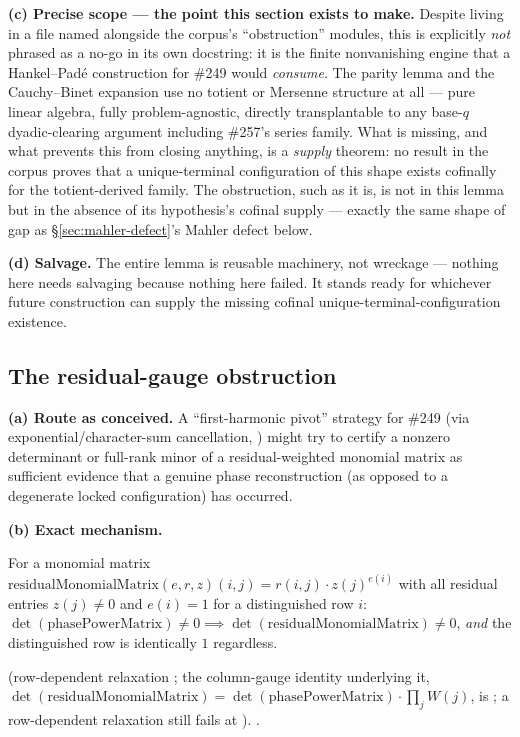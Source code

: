 \textbf{(c) Precise scope — the point this section exists to make.} Despite
living in a file named alongside the corpus's ``obstruction'' modules, this
is explicitly \emph{not} phrased as a no-go in its own docstring: it is the
finite nonvanishing engine that a Hankel--Padé construction for \#249 would
\emph{consume}. The parity lemma and the Cauchy--Binet expansion use no
totient or Mersenne structure at all — pure linear algebra, fully
problem-agnostic, directly transplantable to any base-\(q\) dyadic-clearing
argument including \#257's series family. What is missing, and what
prevents this from closing anything, is a \emph{supply} theorem: no result
in the corpus proves that a unique-terminal configuration of this shape
exists cofinally for the totient-derived family. The obstruction, such as it
is, is not in this lemma but in the absence of its hypothesis's cofinal
supply — exactly the same shape of gap as \S\ref{sec:mahler-defect}'s Mahler
defect below.

\textbf{(d) Salvage.} The entire lemma is reusable machinery, not wreckage —
nothing here needs salvaging because nothing here failed. It stands ready
for whichever future construction can supply the missing cofinal
unique-terminal-configuration existence.

\subsection{The residual-gauge obstruction}

\textbf{(a) Route as conceived.} A ``first-harmonic pivot'' strategy for
\#249 (via exponential/character-sum cancellation,
) might try to certify a nonzero determinant or
full-rank minor of a residual-weighted monomial matrix as sufficient
evidence that a genuine phase reconstruction (as opposed to a degenerate
locked configuration) has occurred.

\textbf{(b) Exact mechanism.}
\begin{prop}
For a monomial matrix \(\mathrm{residualMonomialMatrix}(e,r,z)(i,j) =
r(i,j)\cdot z(j)^{e(i)}\) with all residual entries \(z(j)\ne0\) and
\(e(i)=1\) for a distinguished row \(i\): \(\det(\mathrm{phasePowerMatrix})
\ne0 \implies \det(\mathrm{residualMonomialMatrix})\ne0\), \emph{and} the
distinguished row is identically \(1\) regardless.
\end{prop}
(row-dependent relaxation ; the
column-gauge identity underlying it,
\(\det(\mathrm{residualMonomialMatrix}) =
\det(\mathrm{phasePowerMatrix})\cdot\prod_j W(j)\), is
; a row-dependent relaxation still fails at
).  
.

